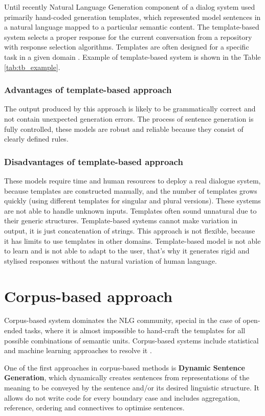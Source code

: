 Until recently Natural Language Generation component of a dialog system used primarily hand-coded generation templates, which represented model sentences in a natural language mapped to a particular semantic content.
The template-based system selects a proper response for the current conversation from a repository with response selection algorithms. Templates are often designed for a specific task in a given domain \cite{manishina2016data}. 
Example of template-based system is shown in the Table \ref{tab:tb_example}.


\subsubsection{Advantages of template-based approach}
The output produced by this approach is likely to be grammatically correct and not contain unexpected generation errors. The process of sentence generation is fully controlled, these models are robust and reliable because they consist of clearly defined rules. 

\subsubsection{Disadvantages of template-based approach}
These models require time and human resources to deploy a real dialogue system, because templates are constructed manually, and the number of templates grows quickly (using different templates for singular and plural versions). These systems are not able to handle unknown inputs. Templates often sound unnatural due to their generic structures. Template-based systems cannot make variation in output, it is just concatenation of strings. This approach is not flexible, because it has limits to use templates in other domains. Template-based model is not able to learn and is not able to adapt to the user, that's why it generates rigid and stylised responses without the natural variation of human language.

\section{Corpus-based approach}
Corpus-based system dominates the NLG community, special in the case of open-ended tasks, where it is almost impossible to hand-craft the templates for all possible combinations of semantic units. Corpus-based systems include statistical and machine learning approaches to resolve it \cite{rudnicky2002dialog}.

One of the first approaches in corpus-based methods is \textbf{Dynamic Sentence Generation}, which dynamically creates sentences from representations of the meaning to be conveyed by the sentence and/or its desired linguistic structure. It allows do not write code for every boundary case and includes aggregation, reference, ordering and connectives to optimise sentences.


